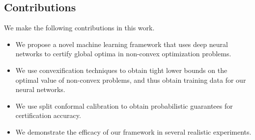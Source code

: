 \documentclass[10pt]{article} %
\theoremstyle{plain}
\theoremstyle{definition}
\theoremstyle{remark}
\begin{document}



\subsection{Contributions}

We make the following contributions in this work.
\begin{itemize}[itemsep=2pt, parsep=1pt]
    \item We propose a novel machine learning framework that uses deep neural networks to certify global optima in non-convex optimization problems.
    \item We use convexification techniques to obtain tight lower bounds on the optimal value of non-convex problems, and thus obtain training data for our neural networks.
    \item We use split conformal calibration to obtain probabilistic guarantees for certification accuracy.
    \item We demonstrate the efficacy of our framework in several realistic experiments.
\end{itemize}
\end{document}
